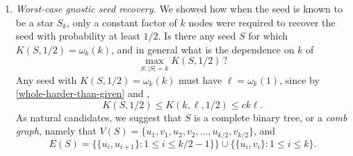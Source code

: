 \begin{enumerate}[label=\textit{\arabic*.}]
\item \textit{Worst-case gnostic seed recovery.} We showed how when
  the seed is known to be a star $S_k$, only a constant factor of $k$
  nodes were required to recover the seed with probability at least
  $1/2$. Is there any seed $S$ for which $K(S, 1/2) = \omega_k(k)$,
  and in general what is the dependence on $k$ of
  \[
    \max_{S \colon |S| = k} K(S, 1/2) \, ?
  \]
  Any seed with $K(S, 1/2) = \omega_k(k)$ must have
  $\ell = \omega_k(1)$, since by \eqref{whole-harder-than-given} and
  , 
  \[
    K(S, 1/2) \le K(k, \ell, 1/2) \le c k \ell .
  \]
  As natural candidates, we suggest that $S$ is a complete binary
  tree, or a \emph{comb graph}, namely that
  $V(S) = \{u_1, v_1, u_2, v_2, \dots, u_{k/2}, v_{k/2}\}$, and
  \[
    E(S) = \Big\{\{u_i, u_{i + 1}\} \colon 1 \le i \le k/2 - 1\}\Big\} \cup \Big\{\{u_i, v_i\} \colon 1 \le i \le k \Big\} .
  \]
\end{enumerate}
